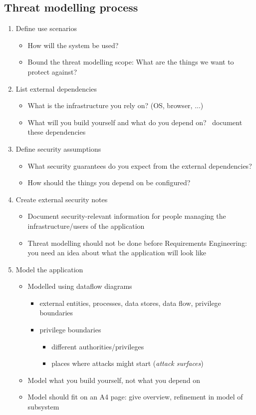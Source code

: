 \documentclass[12pt,titlepage,a4paper]{report}
\begin{document}
	\subsection{Threat modelling process}
	\begin{enumerate}
		\item Define use scenarios
		\begin{itemize}
			\item How will the system be used?
			\item Bound the threat modelling scope: What are the things we want to protect against?
		\end{itemize}
		\item List external dependencies
		\begin{itemize}
			\item What is the infrastructure you rely on? (OS, browser, ...)
			\item What will you build yourself and what do you depend on? \textrightarrow \, document these dependencies
		\end{itemize}
		\item Define security assumptions
		\begin{itemize}
			\item What security guarantees do you expect from the external dependencies?
			\item How should the things you depend on be configured?
		\end{itemize}
		\item Create external security notes
		\begin{itemize}
			\item Document security-relevant information for people managing the infrastructure/users of the application
			\item Threat modelling should not be done before Requirements Engineering: you need an idea about what the application will look like
		\end{itemize}
		\item Model the application
		\begin{itemize}
			\item Modelled using dataflow diagrams
			\begin{itemize}
				\item external entities, processes, data stores, data flow, privilege boundaries
				\item privilege boundaries
				\begin{itemize}
					\item different authorities/privileges
					\item places where attacks might start (\emph{attack surfaces})
				\end{itemize}
			\end{itemize}
			\item Model what you build yourself, not what you depend on
			\item Model should fit on an A4 page: give overview, refinement in model of subsystem
			

\end{itemize}
\end{enumerate}
\end{document}

